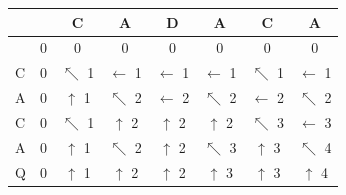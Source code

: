 \documentclass[a4paper, 10pt, twoside]{article}
\begin{document}
\begin{enumerate}[a)]
	      \begin{table}[!ht]
		      \centering
		      \begin{tabular}{l|ccccccc}
			        &                    & C                            & A                              & D                              & A                            & C                            & A                             \\
			      \hline
			        & \cellcolor{gray} 0 & 0                            & 0                              & 0                              & 0                            & 0                            & 0                             \\
			      C & 0                  & \cellcolor{gray}$\nwarrow$ 1 & \cellcolor{gray}$\leftarrow$ 1 & \cellcolor{gray}$\leftarrow$ 1 & $\leftarrow$ 1               & $\nwarrow$ 1                 & $\leftarrow$ 1                \\
			      A & 0                  & $\uparrow$ 1                 & $\nwarrow$ 2                   & $\leftarrow$ 2                 & \cellcolor{gray}$\nwarrow$ 2 & $\leftarrow$ 2               & $\nwarrow$ 2                  \\
			      C & 0                  & $\nwarrow$ 1                 & $\uparrow$ 2                   & $\uparrow$ 2                   & $\uparrow$ 2                 & \cellcolor{gray}$\nwarrow$ 3 & $\leftarrow$ 3                \\
			      A & 0                  & $\uparrow$ 1                 & $\nwarrow$ 2                   & $\uparrow$ 2                   & $\nwarrow$ 3                 & $\uparrow$ 3                 & \cellcolor{gray}$\nwarrow$ 4  \\
			      Q & 0                  & $\uparrow$ 1                 & $\uparrow$ 2                   & $\uparrow$ 2                   & $\uparrow$ 3                 & $\uparrow$ 3                 & \cellcolor{gray} $\uparrow$ 4 \\
		      \end{tabular}
	      \end{table}
\end{enumerate}
\end{document}

